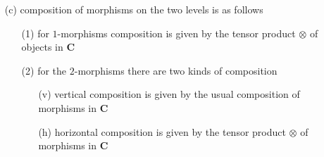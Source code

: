 \begin{itemize}
\begin{enumerate}
\item[(c)]
composition of morphisms on the two levels is as follows
\begin{enumerate}
\item[(1)]
for $1$-morphisms composition is given by the tensor product $\otimes$ of objects in $\mathbf{C}$

\item[(2)]
for the $2$-morphisms there are two kinds of composition
\begin{enumerate}
\item[(v)]
vertical composition is given by the usual composition of morphisms in $\mathbf{C}$

\item[(h)]
horizontal composition is given by the tensor product $\otimes$ of morphisms in $\mathbf{C}$
\end{enumerate}
\end{enumerate}


\end{enumerate}
\end{itemize}
